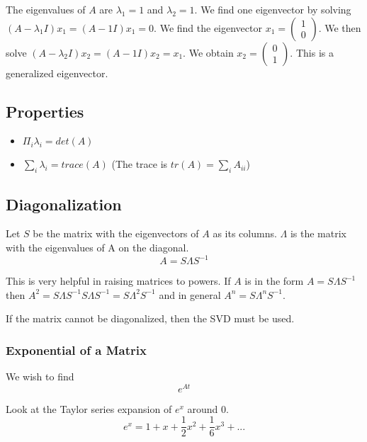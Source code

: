 \documentclass[12pt]{article}
\begin{document}
\begin{itemize}
The eigenvalues of $A$ are $\lambda_1 = 1$ and $\lambda_2 = 1$. We find one eigenvector by solving $(A - \lambda_1 I)x_1 = (A - 1 I)x_1 = 0$. We find the eigenvector $x_1 = \begin{pmatrix}1\\0\end{pmatrix}$. We then solve $(A - \lambda_2 I)x_2 = (A-1I)x_2 = x_1$.  We obtain $x_2 = \begin{pmatrix}0\\1\end{pmatrix}$. This is a generalized eigenvector.


\subsection{Properties}
\begin{itemize}
\item $\Pi_i \lambda_i = det(A)$

\item $\sum_i \lambda_i = trace(A)$ (The trace is $tr(A) = \sum_i A_{ii}$)
\end{itemize}

\subsection{Diagonalization}
Let $S$ be the matrix with the eigenvectors of $A$ as its columns.  $\Lambda$ is the matrix with the eigenvalues of A on the diagonal. 
\begin{equation*}
A=S\Lambda S^{-1} 
\end{equation*}

This is very helpful in raising matrices to powers.  If $A$ is in the form $A=S\Lambda S^{-1}$ then $A^2=S\Lambda S^{-1} S \Lambda S^{-1} = S \Lambda^2 S^{-1}$ and in general $A^n=S \Lambda^n S^{-1}$.  

If the matrix cannot be diagonalized, then the SVD must be used.

\subsubsection{Exponential of a Matrix}
We wish to find 
\begin{equation*}
e^{At} 
\end{equation*}

Look at the Taylor series expansion of $e^x$ around 0. 
\begin{equation*}
e^x = 1 + x+ \frac{1}{2}x^2 + \frac{1}{6}x^3 + ...
\end{equation*}


\end{itemize}
\end{document}
